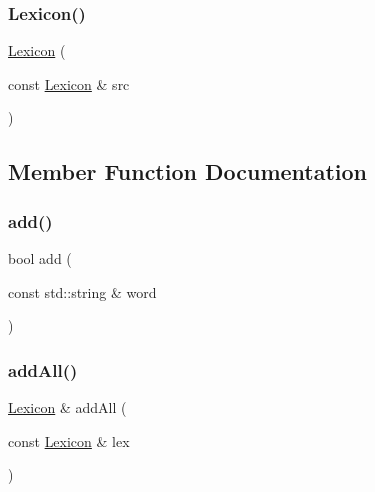 \mbox{\label{classLexicon_acd310b995d41180f2f29bd68bec7d290}} 
\subsubsection{\texorpdfstring{Lexicon()}{Lexicon()}\hspace{0.1cm}{\footnotesize\ttfamily [5/5]}}
{\footnotesize\ttfamily \mbox{\hyperlink{classLexicon}{Lexicon}} (\begin{DoxyParamCaption}\item[{const \mbox{\hyperlink{classLexicon}{Lexicon}} \&}]{src }\end{DoxyParamCaption})}



\subsection{Member Function Documentation}
\mbox{\label{classLexicon_ae678e727fb107637268e8f00cd759889}} 
\subsubsection{\texorpdfstring{add()}{add()}}
{\footnotesize\ttfamily bool add (\begin{DoxyParamCaption}\item[{const std\+::string \&}]{word }\end{DoxyParamCaption})}

\mbox{\label{classLexicon_a9d62d8dcb351ae40c8a2220a9871348b}} 
\subsubsection{\texorpdfstring{add\+All()}{addAll()}\hspace{0.1cm}{\footnotesize\ttfamily [1/2]}}
{\footnotesize\ttfamily \mbox{\hyperlink{classLexicon}{Lexicon}} \& add\+All (\begin{DoxyParamCaption}\item[{const \mbox{\hyperlink{classLexicon}{Lexicon}} \&}]{lex }\end{DoxyParamCaption})}

